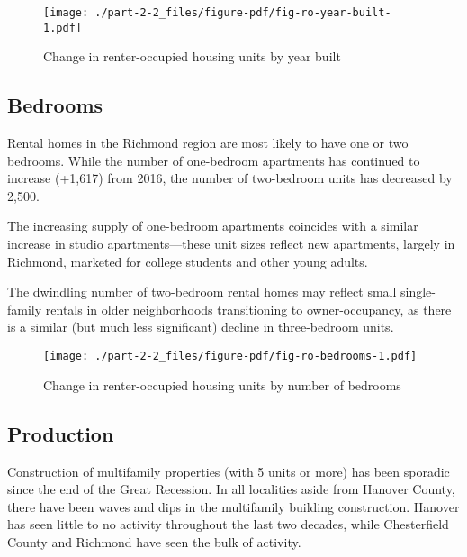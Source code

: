 \documentclass[
  letterpaper,
  DIV=11,
  numbers=noendperiod]{scrreprt}
\begin{document}
\begin{figure}

{\centering \texttt{[image: ./part-2-2\_files/figure-pdf/fig-ro-year-built-1.pdf]}

}

\caption{\label{fig-ro-year-built}Change in renter-occupied housing
units by year built}

\end{figure}

\hypertarget{bedrooms-2}{%
\subsection{Bedrooms}\label{bedrooms-2}}

Rental homes in the Richmond region are most likely to have one or two
bedrooms. While the number of one-bedroom apartments has continued to
increase (+1,617) from 2016, the number of two-bedroom units has
decreased by 2,500.

The increasing supply of one-bedroom apartments coincides with a similar
increase in studio apartments---these unit sizes reflect new apartments,
largely in Richmond, marketed for college students and other young
adults.

The dwindling number of two-bedroom rental homes may reflect small
single-family rentals in older neighborhoods transitioning to
owner-occupancy, as there is a similar (but much less significant)
decline in three-bedroom units.

\begin{figure}

{\centering \texttt{[image: ./part-2-2\_files/figure-pdf/fig-ro-bedrooms-1.pdf]}

}

\caption{\label{fig-ro-bedrooms}Change in renter-occupied housing units
by number of bedrooms}

\end{figure}

\hypertarget{production-1}{%
\subsection{Production}\label{production-1}}

Construction of multifamily properties (with 5 units or more) has been
sporadic since the end of the Great Recession. In all localities aside
from Hanover County, there have been waves and dips in the multifamily
building construction. Hanover has seen little to no activity throughout
the last two decades, while Chesterfield County and Richmond have seen
the bulk of activity.
\end{document}
